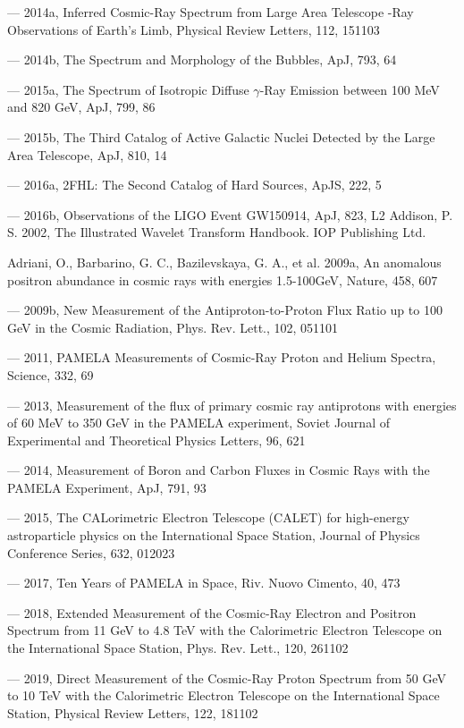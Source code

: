 --- 2014a, Inferred Cosmic-Ray Spectrum from \fermi{} Large Area Telescope -Ray Observations of Earth's Limb, Physical Review Letters, 112, 151103

--- 2014b, The Spectrum and Morphology of the \fermi{} Bubbles, ApJ, 793, 64

--- 2015a, The Spectrum of Isotropic Diffuse $\gamma$-Ray Emission between 100 MeV and 820 GeV, ApJ, 799, 86

--- 2015b, The Third Catalog of Active Galactic Nuclei Detected by the \fermi{} Large Area Telescope, ApJ, 810, 14

--- 2016a, 2FHL: The Second Catalog of Hard \fermilat{} Sources, ApJS, 222, 5

--- 2016b, \fermilat{} Observations of the LIGO Event GW150914, ApJ, 823, L2 Addison, P. S. 2002, The Illustrated Wavelet Transform Handbook. IOP Publishing Ltd.

Adriani, O., Barbarino, G. C., Bazilevskaya, G. A., et al. 2009a, An anomalous positron abundance in cosmic rays with energies 1.5-100GeV, Nature, 458, 607

--- 2009b, New Measurement of the Antiproton-to-Proton Flux Ratio up to 100 GeV in the Cosmic Radiation, Phys. Rev. Lett., 102, 051101

--- 2011, PAMELA Measurements of Cosmic-Ray Proton and Helium Spectra, Science, 332, 69

--- 2013, Measurement of the flux of primary cosmic ray antiprotons with energies of 60 MeV to 350 GeV in the PAMELA experiment, Soviet Journal of Experimental and Theoretical Physics Letters, 96, 621

--- 2014, Measurement of Boron and Carbon Fluxes in Cosmic Rays with the PAMELA Experiment, ApJ, 791, 93

--- 2015, The CALorimetric Electron Telescope (CALET) for high-energy astroparticle physics on the International Space Station, Journal of Physics Conference Series, 632, 012023

--- 2017, Ten Years of PAMELA in Space, Riv. Nuovo Cimento, 40, 473

--- 2018, Extended Measurement of the Cosmic-Ray Electron and Positron Spectrum from 11 GeV to 4.8 TeV with the Calorimetric Electron Telescope on the International Space Station, Phys. Rev. Lett., 120, 261102

--- 2019, Direct Measurement of the Cosmic-Ray Proton Spectrum from 50 GeV to 10 TeV with the Calorimetric Electron Telescope on the International Space Station, Physical Review Letters, 122, 181102

